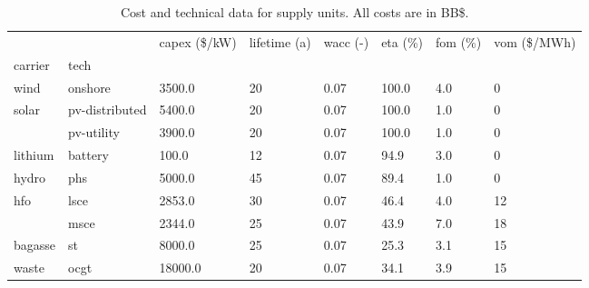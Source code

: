 \begin{table}
\centering
\caption{Cost and technical data for supply units. All costs are in BB\$.}
\label{tab:tech_data}
\begin{tabular}{llp{1.5cm}p{1.5cm}p{1cm}p{1cm}p{0.75cm}p{1.5cm}}
\toprule
      &      &  capex (\$/kW) &  lifetime (a) &  wacc (-) &  eta (\%) &  fom (\%) &  vom (\$/MWh) \\
carrier & tech &               &               &           &          &          &              \\
\midrule
wind & onshore &        3500.0 &            20 &      0.07 &    100.0 &      4.0 &            0 \\
solar & pv-distributed &        5400.0 &            20 &      0.07 &    100.0 &      1.0 &            0 \\
      & pv-utility &        3900.0 &            20 &      0.07 &    100.0 &      1.0 &            0 \\
lithium & battery &         100.0 &            12 &      0.07 &     94.9 &      3.0 &            0 \\
hydro & phs &        5000.0 &            45 &      0.07 &     89.4 &      1.0 &            0 \\
hfo & lsce &        2853.0 &            30 &      0.07 &     46.4 &      4.0 &           12 \\
      & msce &        2344.0 &            25 &      0.07 &     43.9 &      7.0 &           18 \\
bagasse & st &        8000.0 &            25 &      0.07 &     25.3 &      3.1 &           15 \\
waste & ocgt &       18000.0 &            20 &      0.07 &     34.1 &      3.9 &           15 \\
\bottomrule
\end{tabular}
\end{table}
